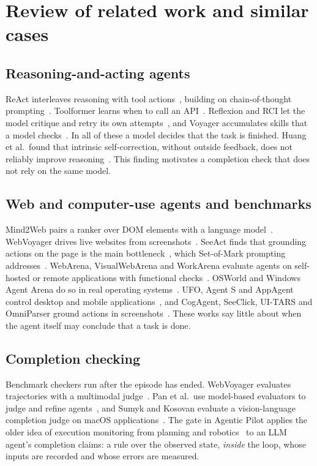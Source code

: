 \section{Review of related work and similar cases}

\subsection{Reasoning-and-acting agents}
ReAct interleaves reasoning with tool actions~\cite{yao2023react}, building on chain-of-thought prompting~\cite{wei2022chain}. Toolformer learns when to call an API~\cite{schick2023toolformer}. Reflexion and RCI let the model critique and retry its own attempts~\cite{shinn2023reflexion,kim2023rci}, and Voyager accumulates skills that a model checks~\cite{wang2024voyager}. In all of these a model decides that the task is finished. Huang et al.\ found that intrinsic self-correction, without outside feedback, does not reliably improve reasoning~\cite{huang2024cannot}. This finding motivates a completion check that does not rely on the same model.

\subsection{Web and computer-use agents and benchmarks}
Mind2Web pairs a ranker over DOM elements with a language model~\cite{deng2023mind2web}. WebVoyager drives live websites from screenshots~\cite{he2024webvoyager}. SeeAct finds that grounding actions on the page is the main bottleneck~\cite{zheng2024seeact}, which Set-of-Mark prompting addresses~\cite{yang2023som}. WebArena, VisualWebArena and WorkArena evaluate agents on self-hosted or remote applications with functional checks~\cite{zhou2024webarena,koh2024visualwebarena,drouin2024workarena}. OSWorld and Windows Agent Arena do so in real operating systems~\cite{xie2024osworld,bonatti2024waa}. UFO, Agent S and AppAgent control desktop and mobile applications~\cite{zhang2025ufo,agashe2025agents,zhang2025appagent}, and CogAgent, SeeClick, UI-TARS and OmniParser ground actions in screenshots~\cite{hong2024cogagent,cheng2024seeclick,qin2025uitars,lu2024omniparser}. These works say little about when the agent itself may conclude that a task is done.

\subsection{Completion checking}
Benchmark checkers run after the episode has ended. WebVoyager evaluates trajectories with a multimodal judge~\cite{he2024webvoyager}. Pan et al.\ use model-based evaluators to judge and refine agents~\cite{pan2024autonomous}, and Sumyk and Kosovan evaluate a vision-language completion judge on macOS applications~\cite{sumyk2025done}. The gate in Agentic Pilot applies the older idea of execution monitoring from planning and robotics~\cite{fikes1972planex,pettersson2005execution} to an LLM agent's completion claims: a rule over the observed state, \emph{inside} the loop, whose inputs are recorded and whose errors are measured.

